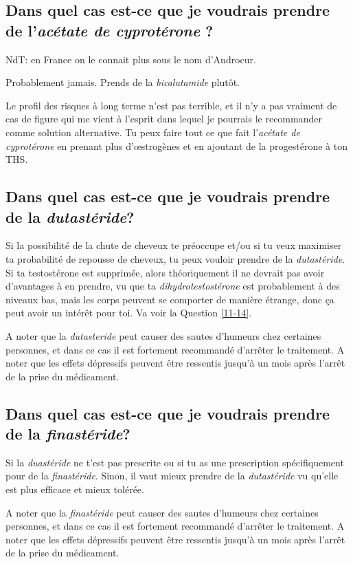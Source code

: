 \documentclass{article}
\begin{document}
\subsection{Dans quel cas est-ce que je voudrais prendre de l'\textit{acétate de cyprotérone} ?}

NdT: en France on le connait plus sous le nom d'Androcur.

Probablement jamais. Prends de la \textit{bicalutamide} plutôt.

Le profil des risques à long terme n'est pas terrible, et il n'y a pas vraiment de cas de figure qui me vient à l'esprit dans lequel je pourrais le recommander comme solution alternative. Tu peux faire tout ce que fait l'\textit{acétate de cyprotérone} en prenant plus d'œstrogènes et en ajoutant de la progestérone à ton THS.

\subsection{Dans quel cas est-ce que je voudrais prendre de la \textit{dutastéride}?}

Si la possibilité de la chute de cheveux te préoccupe et/ou si tu veux maximiser ta probabilité de repousse de cheveux, tu peux vouloir prendre de la \textit{dutastéride}. Si ta testostérone est supprimée, alors théoriquement il ne devrait pas avoir d'avantages à en prendre, vu que ta \textit{dihydrotestostérone} est probablement à des niveaux bas, mais les corps peuvent se comporter de manière étrange, donc ça peut avoir un intérêt pour toi. Va voir la Question \ref{11-14}.

A noter que la \textit{dutasteride} peut causer des sautes d'humeurs chez certaines personnes, et dans ce cas il est fortement recommandé d'arrêter le traitement. A noter que les effets dépressifs peuvent être ressentis jusqu'à un mois après l'arrêt de la prise du médicament.

\subsection{Dans quel cas est-ce que je voudrais prendre de la \textit{finastéride}?}

Si la \textit{duastéride} ne t'est pas prescrite ou si tu as une prescription spécifiquement pour de la \textit{finastéride}. Sinon, il vaut mieux prendre de la \textit{dutastéride} vu qu'elle est plus efficace et mieux tolérée.

A noter que la \textit{finastéride} peut causer des sautes d'humeurs chez certaines personnes, et dans ce cas il est fortement recommandé d'arrêter le traitement. A noter que les effets dépressifs peuvent être ressentis jusqu'à un mois après l'arrêt de la prise du médicament.
\end{document}
